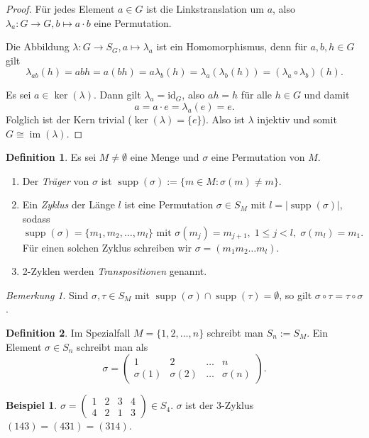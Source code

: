 \documentclass[12pt]{scrartcl} %
\DeclareMathOperator{\im}{im}
\DeclareMathOperator{\supp}{supp}
\theoremstyle{definition}
\newtheorem*{defn}{Definition}
\newtheorem{ex}{Beispiel}
\theoremstyle{remark}
\newtheorem*{nb}{Bemerkung}
\newcommand{\defi}{\emph}
\begin{document}
\begin{proof}
	Für jedes Element $a\in G$ ist die Linkstranslation um $a$, also $\lambda_a:G\to G, b\mapsto a\cdot b$ eine Permutation.

	Die Abbildung $\lambda:G\to S_G, a\mapsto \lambda_a$ ist ein Homomorphismus, denn für $a,b,h\in G$ gilt
	\[\lambda_{ab}(h) = abh = a(bh) = a\lambda_b(h) = \lambda_a(\lambda_b(h)) = (\lambda_a\circ\lambda_b)(h).\]

	Es sei $a\in \ker(\lambda)$.
	Dann gilt $\lambda_a = \text{id}_G$, also $ah = h$ für alle $h\in G $ und damit \[a = a\cdot e = \lambda_a(e) = e.\]
	Folglich ist der Kern trivial (\(\ker(\lambda) = \{e\}\)).
	Also ist $\lambda$ injektiv und somit $G\cong\im(\lambda)$.
\end{proof}

\begin{defn}
	Es sei $M\neq\emptyset$ eine Menge und $\sigma$ eine Permutation von $M$.
	\begin{enumerate}
	\item Der \defi{Träger} von $\sigma$ ist $\supp(\sigma) := \{m\in M: \sigma(m)\neq m\}$.
	\item Ein \defi{Zyklus} der Länge $l$ ist eine Permutation $\sigma\in S_M$ mit $l = |\supp(\sigma)|$, sodass
		\[\supp(\sigma) = \{m_1,m_2,\dots,m_l\}\text{ mit }\sigma(m_j) = m_{j+1},\; 1\leq j<l,\; \sigma(m_l) = m_1.\]
		Für einen solchen Zyklus schreiben wir $\sigma = (m_1m_2\dots m_l)$.
	\item 2-Zyklen werden \defi{Transpositionen} genannt.
	\end{enumerate}
\end{defn}


\begin{nb}
	Sind $\sigma,\tau\in S_M$ mit $\supp(\sigma)\cap \supp(\tau) = \emptyset$, so gilt $\sigma\circ\tau = \tau\circ\sigma$.
\end{nb}


\begin{defn}
	Im Spezialfall $M=\{1,2,\dots,n\}$ schreibt man $S_n := S_M$.
	Ein Element $\sigma\in S_n$ schreibt man als
	\[\sigma = \begin{pmatrix}
	 1 & 2 & \dots & n \\
	 \sigma(1) & \sigma(2) & \dots & \sigma(n) \end{pmatrix}.\]
\end{defn}

\begin{ex}
	$\sigma = \begin{pmatrix}
	1 & 2 & 3 & 4 \\
	4 & 2 & 1 & 3 \end{pmatrix} \in S_4$.
	$\sigma$ ist der 3-Zyklus $(143) = (431) = (314)$.
\end{ex}
\end{document}
